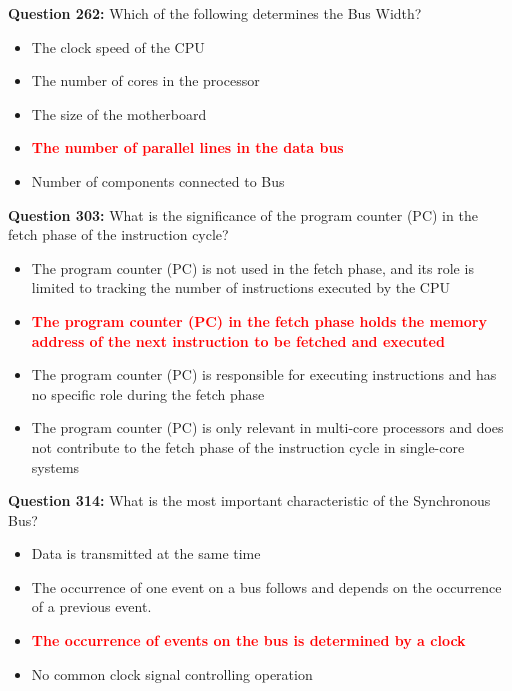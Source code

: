 \documentclass[12pt,a4paper]{article}
\begin{document}
\vspace{0.5cm}

\textbf{Question 262:} Which of the following determines the Bus Width?

\begin{itemize}
    \item[\textbf{A.}] The clock speed of the CPU
    \item[\textbf{B.}] The number of cores in the processor
    \item[\textbf{C.}] The size of the motherboard
    \item[\textbf{D.}] \textcolor{red}{\textbf{The number of parallel lines in the data bus}}
    \item[\textbf{E.}] Number of components connected to Bus
\end{itemize}

\vspace{0.5cm}

\textbf{Question 303:} What is the significance of the program counter (PC) in the fetch phase of the instruction cycle?

\begin{itemize}
    \item[\textbf{A.}] The program counter (PC) is not used in the fetch phase, and its role is limited to tracking the number of instructions executed by the CPU
    \item[\textbf{B.}] \textcolor{red}{\textbf{The program counter (PC) in the fetch phase holds the memory address of the next instruction to be fetched and executed}}
    \item[\textbf{C.}] The program counter (PC) is responsible for executing instructions and has no specific role during the fetch phase
    \item[\textbf{D.}] The program counter (PC) is only relevant in multi-core processors and does not contribute to the fetch phase of the instruction cycle in single-core systems
\end{itemize}

\vspace{0.5cm}

\textbf{Question 314:} What is the most important characteristic of the Synchronous Bus?

\begin{itemize}
    \item[\textbf{A.}] Data is transmitted at the same time
    \item[\textbf{B.}] The occurrence of one event on a bus follows and depends on the occurrence of a previous event.
    \item[\textbf{C.}] \textcolor{red}{\textbf{The occurrence of events on the bus is determined by a clock}}
    \item[\textbf{D.}] No common clock signal controlling operation
\end{itemize}
\end{document}
